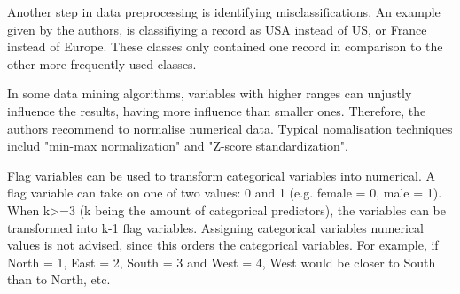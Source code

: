 Another step in data preprocessing is identifying misclassifications. An example given by the authors, is classifiying a record as USA instead of US, or France instead of Europe. These classes only contained one record in comparison to the other more frequently used classes.


In some data mining algorithms, variables with higher ranges can unjustly influence the results, having more influence than smaller ones. Therefore, the authors recommend to normalise numerical data. Typical nomalisation techniques includ "min-max normalization" and "Z-score standardization".

Flag variables can be used to transform categorical variables into numerical. A flag variable can take on one of two values: 0 and 1 (e.g. female = 0, male = 1). When k>=3 (k being the amount of categorical predictors), the variables can be transformed into k-1 flag variables. Assigning categorical variables numerical values is not advised, since this orders the categorical variables. For example, if North = 1, East = 2, South = 3 and West = 4, West would be closer to South than to North, etc.





